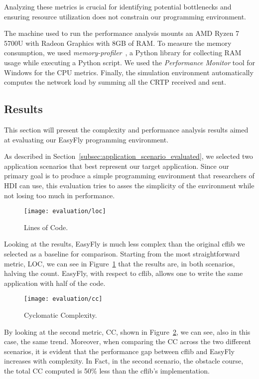 Analyzing these metrics is crucial for identifying potential bottlenecks and ensuring resource utilization does not constrain our programming environment.

The machine used to run the performance analysis mounts an AMD Ryzen 7 5700U with Radeon Graphics with 8GB of RAM.
To measure the memory consumption, we used \textit{memory-profiler}~\cite{memoryProfiler}, a Python library for collecting RAM usage while executing a Python script.
We used the \textit{Performance Monitor} tool for Windows for the CPU metrics. 
Finally, the simulation environment automatically computes the network load by summing all the CRTP received and sent.

\subsection{Results}\label{subsec:result_analysis}
This section will present the complexity and performance analysis results aimed at evaluating our EasyFly programming environment.

As described in Section~\ref{subsec:application_scenario_evaluated}, we selected two application scenarios that best represent our target application.
Since our primary goal is to produce a simple programming environment that researchers of HDI can use, this evaluation tries to asses the simplicity of the environment while not losing too much in performance. 

\begin{figure}[tb]
    \centering
    \texttt{[image: evaluation/loc]}
    \caption{Lines of Code.}\label{fig:loc_count}
\end{figure}

Looking at the results, EasyFly is much less complex than the original cflib we selected as a baseline for comparison.
Starting from the most straightforward metric, LOC, we can see in Figure~\ref{fig:loc_count} that the results are, in both scenarios, halving the count.
EasyFly, with respect to cflib, allows one to write the same application with half of the code.

\begin{figure}[tb]
    \centering
    \texttt{[image: evaluation/cc]}
    \caption{Cyclomatic Complexity.}\label{fig:cc}
\end{figure}

By looking at the second metric, CC, shown in Figure~\ref{fig:cc}, we can see, also in this case, the same trend.
Moreover, when comparing the CC across the two different scenarios, it is evident that the performance gap between cflib and EasyFly increases with complexity.
In Fact, in the second scenario, the obstacle course, the total CC computed is 50\% less than the cflib's implementation.

